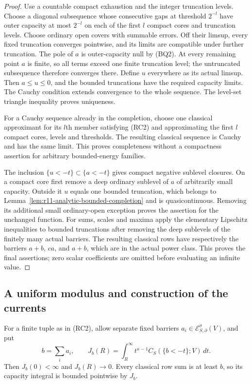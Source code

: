 \documentclass[11pt,a4paper]{article}
\numberwithin{equation}{section}
\theoremstyle{definition}
\theoremstyle{remark}
\begin{document}
\begin{proof}
Use a countable compact exhaustion and the integer truncation
levels. Choose a diagonal subsequence whose consecutive gaps
at threshold $2^{-l}$ have outer capacity at most $2^{-l}$
on each of the first $l$ compact cores and truncation levels.
Choose ordinary open covers with summable errors. Off their
limsup, every fixed truncation converges pointwise, and its
limits are compatible under further truncation.
The pole of $a$ is outer-capacity null by (BQ2).
At every remaining point $a$ is finite, so all terms exceed
one finite truncation level; the untruncated subsequence
therefore converges there. Define $u$ everywhere as its
actual limsup. Then $a\leq u\leq0$, and the bounded
truncations have the required capacity limits. The Cauchy
condition extends convergence to the whole sequence.
The level-set triangle inequality proves uniqueness.

For a Cauchy sequence already in the completion, choose one
classical approximant for its $l$th member satisfying (RC2)
and approximating the first $l$ compact cores, levels and
thresholds. The resulting classical sequence is Cauchy and
has the same limit. This proves completeness without a
compactness assertion for arbitrary bounded-energy families.

The inclusion $\{u<-t\}\subset\{a<-t\}$ gives compact
negative sublevel closures. On a compact core first remove
a deep ordinary sublevel of $a$ of arbitrarily small capacity.
Outside it $u$ equals one bounded truncation, which belongs
to Lemma~\ref{lem:r11-analytic-bounded-completion} and is
quasicontinuous. Removing its additional small ordinary-open
exception proves the assertion for the unchanged function.
For sums, scales and maxima apply the elementary Lipschitz
inequalities to bounded truncations after removing the deep
sublevels of the finitely many actual barriers. The resulting
classical rows have respectively the barriers $a+b$, $ca$,
and $a+b$, which are in the actual power class. This proves
the final assertions; zero scalar coefficients are omitted
before evaluating an infinite value.
\end{proof}

\subsection{A uniform modulus and construction of the currents}

For a finite tuple as in (RC2), allow separate fixed barriers
$a_i\in\mathcal E^\sigma_{S,\partial}(V)$, and put
\[
 b=\sum_i a_i,\qquad
 J_b(R)=\int_R^\infty t^{\kappa-1}C_S(\{b<-t\};V)\,dt.
 \tag{RC3}
\]
Then $J_b(0)<\infty$ and $J_b(R)\to0$. Every classical
row sum is at least $b$, so its capacity integral is bounded
pointwise by $J_b$.
\end{document}
